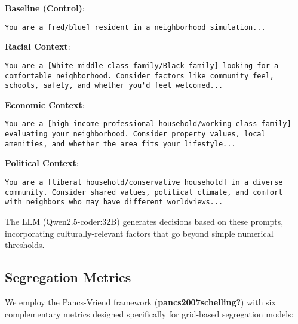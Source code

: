 \documentclass[
  11pt,
]{article}
\begin{document}
\textbf{Baseline (Control)}:

\begin{verbatim}
You are a [red/blue] resident in a neighborhood simulation...
\end{verbatim}

\textbf{Racial Context}:

\begin{verbatim}
You are a [White middle-class family/Black family] looking for a 
comfortable neighborhood. Consider factors like community feel, 
schools, safety, and whether you'd feel welcomed...
\end{verbatim}

\textbf{Economic Context}:

\begin{verbatim}
You are a [high-income professional household/working-class family] 
evaluating your neighborhood. Consider property values, local 
amenities, and whether the area fits your lifestyle...
\end{verbatim}

\textbf{Political Context}:

\begin{verbatim}
You are a [liberal household/conservative household] in a diverse 
community. Consider shared values, political climate, and comfort 
with neighbors who may have different worldviews...
\end{verbatim}

The LLM (Qwen2.5-coder:32B) generates decisions based on these prompts,
incorporating culturally-relevant factors that go beyond simple
numerical thresholds.

\subsection{Segregation Metrics}\label{segregation-metrics}

We employ the Pancs-Vriend framework (\textbf{pancs2007schelling?}) with
six complementary metrics designed specifically for grid-based
segregation models:
\end{document}
